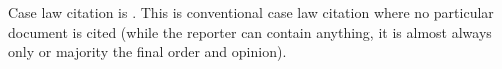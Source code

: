 \documentclass[english]{article}
\begin{document}
Case law citation is \cite{gibbonsvogden}. This is conventional case law citation where no particular document is cited (while the reporter can contain anything, it is almost always only or majority the final order and opinion).

\lipsum[1]

\printbibliography[title={Table of Cases}]
\end{document}
